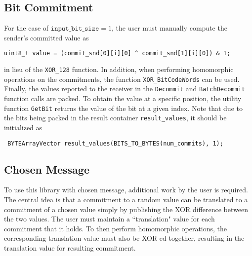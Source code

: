 \subsection{Bit Commitment}

For the case of $\texttt{input\_bit\_size} =1$, the user must manually compute the sender's committed value as 
\begin{lstlisting}     
uint8_t value = (commit_snd[0][i][0] ^ commit_snd[1][i][0]) & 1;
\end{lstlisting}
in lieu of the \texttt{XOR\_128} function. In addition, when performing homomorphic operations on the commitments, the function \texttt{XOR\_BitCodeWords} can be used. Finally, the values reported to the receiver in the \texttt{Decommit} and \texttt{BatchDecommit} function calls are packed. To obtain the value at a specific position, the utility function \texttt{GetBit} returns the value of the bit at a given index. Note that due to the bits being packed in the result container \texttt{result\_values}, it should be initialized as
\begin{lstlisting}     
 BYTEArrayVector result_values(BITS_TO_BYTES(num_commits), 1);
\end{lstlisting}

\subsection{Chosen Message}

To use this library with chosen message, additional work by the user is required. The central idea is that a commitment to a random value can be translated to a commitment of a chosen value simply by publishing the XOR difference between the two values. The user must maintain a ``translation" value for each commitment that it holds. To then perform homomorphic operations, the corresponding translation value must also be XOR-ed together, resulting in the translation value for resulting commitment.